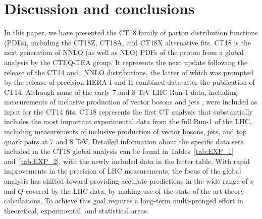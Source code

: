 \section{Discussion and conclusions
\label{sec:Conclusions}
}
In this paper, we have presented the CT18 family of parton distribution functions (PDFs), including the CT18Z, CT18A, and CT18X alternative fits. CT18 is the next generation of NNLO (as well as NLO)
PDFs of the proton from a global analysis by the CTEQ-TEA group. It represents the next update following the release of the CT14 and \CTHERAII~NNLO distributions, the latter of which was prompted
by the release of precision HERA I and II combined data after the publication of CT14. Although some of the early 7 and 8 TeV LHC Run-1 data, including measurements of inclusive production of vector bosons
\cite{Aaij:2012vn, Chatrchyan:2013mza, Chatrchyan:2012xt, Aad:2011dm} and jets \cite{Aad:2011fc, Chatrchyan:2012bja}, were included as input for the CT14 fits, CT18 represents the first CT analysis that
substantially includes the most important experimental data from the full Run-1 of the LHC, including measurements of inclusive production of vector bosons, jets, and top quark pairs at 7 and 8 TeV.
Detailed information about the specific data sets included in the CT18 global analysis can be found in Tables~\ref{tab:EXP_1} and~\ref{tab:EXP_2}, with the newly included data in the latter table.
%
%
With rapid improvements in the precision of LHC measurements, the focus of the global analysis has shifted toward providing accurate predictions in the wide range of $x$ and $Q$ covered by the LHC data, by making use of the state-of-the-art theory calculations. 
To achieve this goal requires a long-term multi-pronged effort in
theoretical, experimental, and statistical areas.


